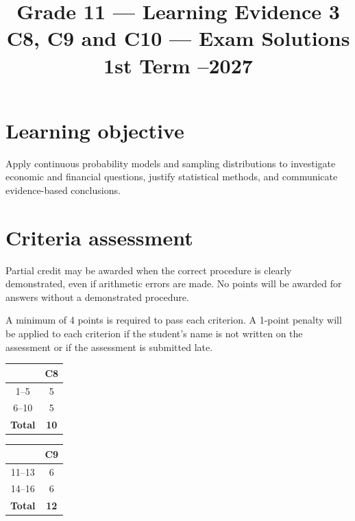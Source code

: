 \makeatletter
{}
\makeatother

\graphicspath{{./}{../}{../../}{../../../}{../../../../}{preamble/}{../preamble/}{../../preamble/}{../../../preamble/}{../../../../preamble/}}
\linespread{1.0}
\setlength{\parskip}{5pt}
\usepackage{needspace}
\title{Grade 11 --- Learning Evidence 3\\C8, C9 and C10 --- Exam Solutions\\\large 1st Term --2027}
\author{}
\date{}

\maketitle
\setcounter{tocdepth}{1}
\setcounter{secnumdepth}{2}
\label{toc}
\tableofcontents

\section*{Learning objective}
Apply continuous probability models and sampling distributions to investigate economic and financial questions, justify statistical methods, and communicate evidence-based conclusions.

\section*{Criteria assessment}
Partial credit may be awarded when the correct procedure is clearly demonstrated, even if arithmetic errors are made. No points will be awarded for answers without a demonstrated procedure.

A minimum of 4 points is required to pass each criterion. A 1-point penalty will be applied to each criterion if the student's name is not written on the assessment or if the assessment is submitted late.


\begin{center}
	\begin{tabular}{|c|c|}
		\hline
		\textbf{\textnumero} & \textbf{C8} \\ \hline
		1--5 & 5 \\ \hline
		6--10 & 5 \\ \hline
		\textbf{Total} & \textbf{10} \\ \hline
	\end{tabular}
	\hspace{1cm}
	\begin{tabular}{|c|c|}
		\hline
		\textbf{\textnumero} & \textbf{C9} \\ \hline
		11--13 & 6 \\ \hline
		14--16 & 6 \\ \hline
		\textbf{Total} & \textbf{12} \\ \hline
	\end{tabular}
\end{center}



